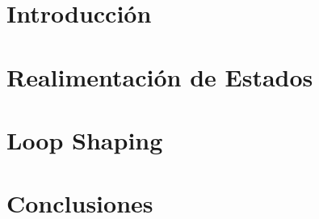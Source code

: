 




\setmainfont{AvenirLTStd-Roman}




\setmainfont{Calibri}


\MyIndex

\hypersetup{linkcolor=AzulInfo}

\newpage




\section{Introducción}


\section{Realimentación de Estados}


\section{Loop Shaping}


\section{Conclusiones}



